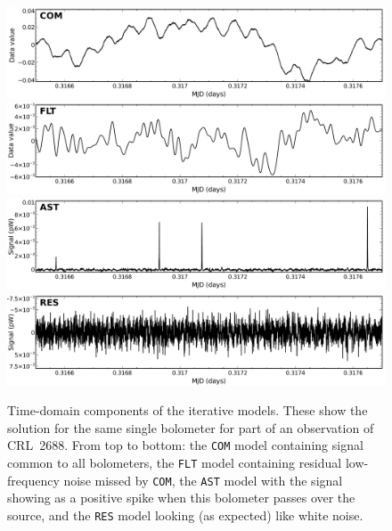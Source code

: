 \documentclass[twoside,11pt]{article}
\newenvironment{latexonly}{}{}
\renewcommand{\_}{\texttt{\symbol{95}}}
\newcommand{\model}[1]{\texttt{#1}}
\begin{document}
\begin{figure}
\begin{center}
\begin{latexonly}
\end{latexonly}
\begin{htmlonly}
  \includegraphics[width=136mm]{sc21_com} \\
  \includegraphics[width=136mm]{sc21_flt} \\
  \includegraphics[width=136mm]{sc21_ast} \\
  \includegraphics[width=136mm]{sc21_res} \\
\end{htmlonly}
\caption[Iterative models in the time domain]{\small Time-domain
components of the iterative models. These show the solution for the
same single bolometer for part of an observation of CRL~2688. From top
to bottom: the \model{COM} model containing signal common to all
bolometers, the \model{FLT} model containing residual low-frequency
noise missed by \model{COM}, the \model{AST} model with the signal
showing as a positive spike when this bolometer passes over the
source, and the \model{RES} model looking (as expected) like white
noise.}
\label{fig:itercomp}
\end{center}
\end{figure}
\end{document}
